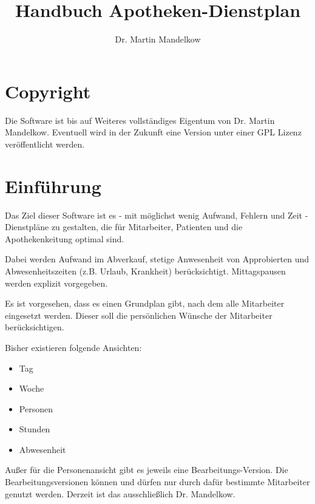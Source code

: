 \documentclass[10pt,a4paper,titlepage,oneside]{article}
\author{Dr. Martin Mandelkow}
\title{Handbuch Apotheken-Dienstplan}
\begin{document}
\maketitle
\tableofcontents\pagebreak










\section{Copyright}
Die Software ist bis auf Weiteres vollständiges Eigentum von Dr. Martin Mandelkow.
Eventuell wird in der Zukunft eine Version unter einer GPL Lizenz veröffentlicht werden.










\section{Einführung}
Das Ziel dieser Software ist es - mit möglichst wenig Aufwand, Fehlern und Zeit - Dienstpläne zu gestalten, die für Mitarbeiter, Patienten und die Apothekenkeitung optimal sind.

Dabei werden Aufwand im Abverkauf, stetige Anwesenheit von Approbierten und Abwesenheitszeiten (z.B. Urlaub, Krankheit) berücksichtigt. Mittagspausen werden explizit vorgegeben.

Es ist vorgesehen, dass es einen Grundplan gibt, nach dem alle Mitarbeiter eingesetzt werden. Dieser soll die persönlichen Wünsche der Mitarbeiter berücksichtigen.

Bisher existieren folgende Ansichten:
\begin{itemize}
	\item Tag
	\item Woche
	\item Personen
	\item Stunden
	\item Abwesenheit
\end{itemize}

Außer für die Personenansicht gibt es jeweils eine Bearbeitungs-Version.
Die Bearbeitungsversionen können und dürfen nur durch dafür bestimmte Mitarbeiter genutzt werden. Derzeit ist das ausschließlich Dr. Mandelkow.
\end{document}
